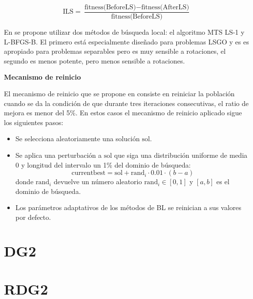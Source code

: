 \[
\text{ILS} = \frac{\text{fitness(BeforeLS)} - \text{fitness(AfterLS)}}{\text{fitness(BeforeLS)}}
\]

\vspace{10px}

En \cite{Molina2018} se propone utilizar dos métodos de búsqueda local: el algoritmo MTS LS-1 y L-BFGS-B. El primero está especialmente diseñado para problemas LSGO y es es apropiado para problemas separables pero es muy sensible a rotaciones, el segundo es menos potente, pero menos sensible a rotaciones.

\vspace{10px}

\noindent\textbf{Mecanismo de reinicio}

El mecanismo de reinicio que se propone en \citep{Molina2018} consiste en reiniciar la población cuando se da la condición de que durante tres iteraciones consecutivas, el ratio de mejora es menor del 5\%. En estos casos el mecanismo de reinicio aplicado sigue los siguientes pasos:

\begin{itemize}
    \item Se selecciona aleatoriamente una solución \( \text{sol} \).
    \item Se aplica una perturbación a \( \text{sol} \) que siga una distribución uniforme de media 0 y longitud del intervalo un 1\% del dominio de búsqueda:
    \[
    \text{currentbest} = \text{sol} + \text{rand}_{i} \cdot 0.01 \cdot (b - a)
    \]
    donde \( \text{rand}_{i} \) devuelve un número aleatorio \( \text{rand}_{i} \in [0, 1] \) y \( [a, b] \) es el dominio de búsqueda.
    \item Los parámetros adaptativos de los métodos de BL se reinician a sus valores por defecto.
\end{itemize}

\section{DG2}
\cite{DG2}
\section{RDG2}

\endinput
